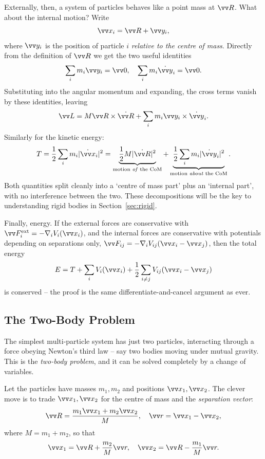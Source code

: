 Externally, then, a system of particles behaves like a point mass at $\vv R$. What about the internal motion? Write
$$
\vv x_i = \vv R + \vv y_i,
$$
where $\vv y_i$ is the position of particle $i$ \emph{relative to the centre of mass}. Directly from the definition of $\vv R$ we get the two useful identities
$$
\sum_i m_i \vv y_i = \vv 0, \quad \sum_i m_i \dot{\vv y}_i = \vv 0.
$$
Substituting into the angular momentum and expanding, the cross terms vanish by these identities, leaving
$$
\vv L = M \vv R \times \dot{\vv R} + \sum_i m_i \vv y_i \times \dot{\vv y}_i.
$$
Similarly for the kinetic energy:
$$
T = \frac{1}{2}\sum_i m_i |\dot{\vv x}_i|^2 = \underbrace{\frac{1}{2}M |\dot{\vv R}|^2}_{\text{motion \emph{of} the CoM}} + \underbrace{\frac{1}{2}\sum_i m_i |\dot{\vv y}_i|^2}_{\text{motion \emph{about} the CoM}}.
$$
Both quantities split cleanly into a `centre of mass part' plus an `internal part', with no interference between the two. These decompositions will be the key to understanding rigid bodies in Section~\ref{sec:rigid}.

Finally, energy. If the external forces are conservative with $\vv F_i^{\text{ext}} = -\nabla_i V_i(\vv x_i)$, and the internal forces are conservative with potentials depending on separations only, $\vv F_{ij} = -\nabla_i V_{ij}(\vv x_i - \vv x_j)$, then the total energy
$$
E = T + \sum_i V_i(\vv x_i) + \frac{1}{2}\sum_{i \neq j} V_{ij}(\vv x_i - \vv x_j)
$$
is conserved -- the proof is the same differentiate-and-cancel argument as ever.

\subsection{The Two-Body Problem}

The simplest multi-particle system has just two particles, interacting through a force obeying Newton's third law -- say two bodies moving under mutual gravity. This is the \emph{two-body problem}, and it can be solved completely by a change of variables.

Let the particles have masses $m_1, m_2$ and positions $\vv x_1, \vv x_2$. The clever move is to trade $\vv x_1, \vv x_2$ for the centre of mass and the \emph{separation vector}:
$$
\vv R = \frac{m_1 \vv x_1 + m_2 \vv x_2}{M}, \quad \vv r = \vv x_1 - \vv x_2,
$$
where $M = m_1 + m_2$, so that
$$
\vv x_1 = \vv R + \frac{m_2}{M} \vv r, \quad \vv x_2 = \vv R - \frac{m_1}{M}\vv r.
$$

\begin{center}
\end{center}

